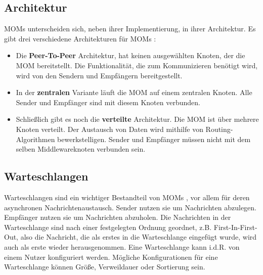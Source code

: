 \subsection{Architektur}
MOMs unterscheiden sich, neben ihrer Implementierung, in ihrer Architektur. Es gibt drei verschiedene Architekturen für MOMs \cite{Rathfelder2013}:
\begin{itemize}
\item Die \textbf{Peer-To-Peer} Architektur, hat keinen ausgewählten Knoten, der die MOM bereitstellt. Die Funktionalität, die zum Kommunizieren benötigt wird, wird von den Sendern und Empfängern bereitgestellt.
\item In der \textbf{zentralen} Variante läuft die MOM auf einem zentralen Knoten. Alle Sender und Empfänger sind mit diesem Knoten verbunden. 
\item Schließlich gibt es noch die \textbf{verteilte} Architektur. Die MOM ist über mehrere Knoten verteilt. Der Austausch von Daten wird mithilfe von Routing-Algorithmen bewerkstelligen. Sender und Empfänger müssen nicht mit dem selben Middlewareknoten verbunden sein.
\end{itemize}  

\subsection{Warteschlangen}
Warteschlangen sind ein wichtiger Bestandteil von MOMs \cite{Curry05}, vor allem für deren asynchronen Nachrichtenaustausch. Sender nutzen sie um Nachrichten abzulegen. Empfänger nutzen sie um Nachrichten abzuholen. Die Nachrichten in der Warteschlange sind nach einer festgelegten Ordnung geordnet, z.B. First-In-First-Out, also die Nachricht, die als erstes in die Warteschlange eingefügt wurde, wird auch als erste wieder herausgenommen. Eine Warteschlange kann i.d.R. von einem Nutzer konfiguriert werden. Mögliche Konfigurationen für eine Warteschlange können Größe, Verweildauer oder Sortierung sein.

